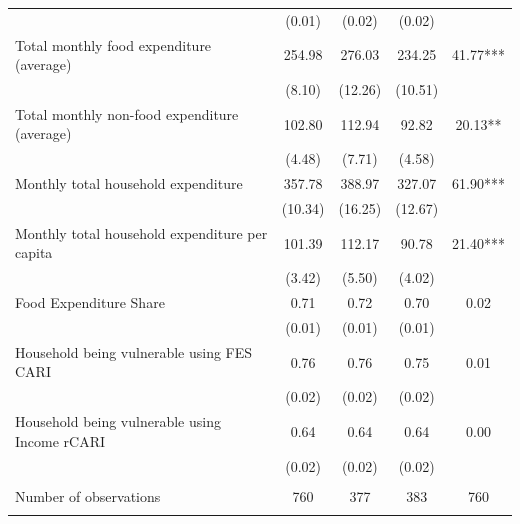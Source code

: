 \begin{tabular}{@{\extracolsep{5pt}}lcccc}
 & (0.01)  & (0.02)  & (0.02)  &  \\ [1ex]
Total monthly food expenditure (average)   & 254.98    & 276.03    & 234.25    & 41.77***   \\
 & (8.10)  & (12.26)  & (10.51)  &  \\ [1ex]
Total monthly non-food expenditure (average)   & 102.80    & 112.94    & 92.82    & 20.13**   \\
 & (4.48)  & (7.71)  & (4.58)  &  \\ [1ex]
Monthly total household expenditure   & 357.78    & 388.97    & 327.07    & 61.90***   \\
 & (10.34)  & (16.25)  & (12.67)  &  \\ [1ex]
Monthly total household expenditure per capita   & 101.39    & 112.17    & 90.78    & 21.40***   \\
 & (3.42)  & (5.50)  & (4.02)  &  \\ [1ex]
Food Expenditure Share   & 0.71    & 0.72    & 0.70    & 0.02   \\
 & (0.01)  & (0.01)  & (0.01)  &  \\ [1ex]
Household being vulnerable using FES CARI   & 0.76    & 0.76    & 0.75    & 0.01   \\
 & (0.02)  & (0.02)  & (0.02)  &  \\ [1ex]
Household being vulnerable using Income rCARI   & 0.64    & 0.64    & 0.64    & 0.00   \\
 & (0.02)  & (0.02)  & (0.02)  &  \\ [1ex]
\hline \\[-1.8ex]
Number of observations  & 760   & 377   & 383  & 760  \\
\hline \hline \\[-1.8ex]

\end{tabular}
